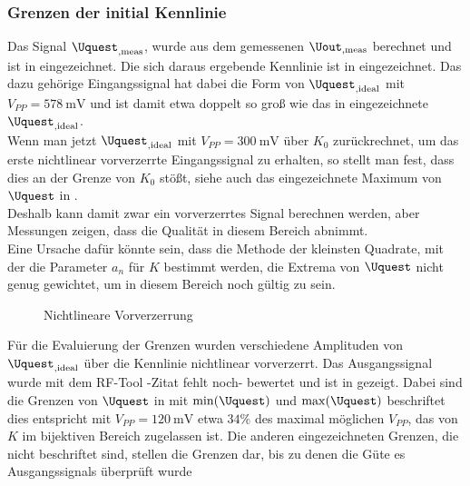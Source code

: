 \documentclass[../Report.tex]{subfiles}
\begin{document}
\subsubsection*{Grenzen der initial Kennlinie}
\label{subsubsec:opt.adjusta.problem}
Das Signal $\Uquest_{,\mathrm{meas}}$, wurde aus dem gemessenen $\Uout_{,\mathrm{meas}}$ berechnet und ist in  eingezeichnet. Die sich daraus ergebende Kennlinie ist in  eingezeichnet. Das dazu gehörige Eingangssignal hat dabei die Form von $\Uquest_{, \mathrm{ideal}}$ mit $V_{PP} = \SI{578}{\mV}$ und ist damit etwa doppelt so groß wie das in  eingezeichnete $\Uquest_{, \mathrm{ideal}}$.\\
Wenn man jetzt $\Uquest_{, \mathrm{ideal}}$ mit $V_{PP} = \SI{300}{\mV}$ über $K_0$ zurückrechnet, um das erste nichtlinear vorverzerrte Eingangssignal zu erhalten, so stellt man fest, dass dies an der Grenze von $K_0$ stößt, siehe auch das eingezeichnete Maximum von $\Uquest$ in . \\
Deshalb kann damit zwar ein vorverzerrtes Signal berechnen werden, aber Messungen zeigen, dass die Qualität in diesem Bereich abnimmt. \\
Eine Ursache dafür könnte sein, dass die Methode der kleinsten Quadrate, mit der die Parameter $a_n$ für $K$ bestimmt werden, die Extrema von $\Uquest$ nicht genug gewichtet, um in diesem Bereich noch gültig zu sein.
\begin{figure}[H]
\begin{subfigure}{0.5 \textwidth}
	\setlength\figureheight{7.5cm}
	\setlength\figurewidth{7.5cm}
    	
	\label{fig:K0}
\end{subfigure}
\begin{subfigure}{0.5 \textwidth}
	\setlength\figureheight{7.5cm}
	\setlength\figurewidth{7.5cm}
    
	\label{fig:UinUquest}
\end{subfigure}
\caption{Nichtlineare Vorverzerrung}
\label{fig:Amplitudenproblem}
\end{figure}

Für die Evaluierung der Grenzen wurden verschiedene Amplituden von $\Uquest_{,\textrm{ideal}}$ über die Kennlinie nichtlinear vorverzerrt. Das Ausgangssignal wurde mit dem RF-Tool -Zitat fehlt noch- bewertet und ist in  gezeigt. Dabei sind die Grenzen von $\Uquest$ in  mit $\min(\Uquest)$ und $\max(\Uquest)$ beschriftet dies entspricht mit $V_{PP} = \SI{120}{\mV}$ etwa $34\%$ des maximal möglichen $V_{PP}$, das von $K$ im bijektiven Bereich zugelassen ist. Die anderen eingezeichneten Grenzen, die nicht beschriftet sind, stellen die Grenzen dar, bis zu denen die Güte es Ausgangssignals überprüft wurde
\end{document}
